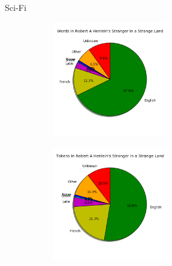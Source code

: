 \documentclass[10pt]{beamer}
\begin{document}
\begin{frame}[fragile]{Sci-Fi}

  \begin{figure}
  \centering
  \begin{subfigure}
  \centering
    \includegraphics[width=5cm]{scifiwords.png}
  \end{subfigure}
  \begin{subfigure}
  \centering
    \includegraphics[width=5cm]{scifitokens.png}
  \end{subfigure}
  \end{figure}
  
\end{frame}
\end{document}
